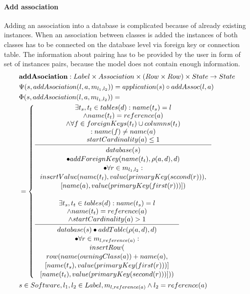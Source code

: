 \documentclass[11pt]{article}
\begin{document}
\paragraph{Add association} Adding an association into a database is complicated because of already existing instances. When an association between classes is added the instances of both classes has to be connected on the database level via foreign key or connection table. The information about pairing has to be provided by the user in form of set of instances pairs, because the model does not contain enough information. 
\begin{align*}
& \mathbf{addAsociation} : Label \times Association \times (Row \times Row) \times State \rightarrow State \\
& \Psi(s, addAsociation(l, a, m_{l_1, l_2})) = application(s) \circ addAssoc(l, a) \\
& \Phi(s, addAsociation(l, a, m_{l_1, l_2})) = \\
& = \begin{cases}
	\inference{ \exists t_s, t_t \in tables(d) : name(t_s) = l\\ 		\wedge name(t_t) = reference(a) \\ \wedge \forall f \in foreignKeys(t_t) \cup columns(t_t) \\: name(f) \neq name(a) \\ startCardinality(a) \leq 1}{\begin{gathered}
		database(s) \\ \bullet addForeignKey(name(t_t), \rho(a,d), d) \\ \bullet \forall r \in m_{l_1, l_2} : \\
		insertValue(name(t_t), value(primaryKey(second(r))), \\ [name(a), value(primaryKey(first(r)))])
	\end{gathered}}
 \\ \\
	\inference{ \exists t_s, t_t \in tables(d) : name(t_s) = l \\ \wedge name(t_t) = reference(a) \\ \wedge startCardinality(a) > 1}{\begin{gathered} 
	database(s) \bullet addTable(\rho(a,d),d) \\ \bullet \forall r \in m_{l, reference(a)} :
	\\ insertRow(\\ row(name(owningClass(a)) + name(a), \\ [name(t_s), value(primaryKey(first(r)))]\\ [name(t_t), value(primaryKey(second(r)))]))
	\end{gathered}} 
\end{cases}\\
& s \in Software, l_1, l_2 \in Label, m_{l, reference(a)} \wedge l_2 = reference(a)
\end{align*} 
\end{document}
